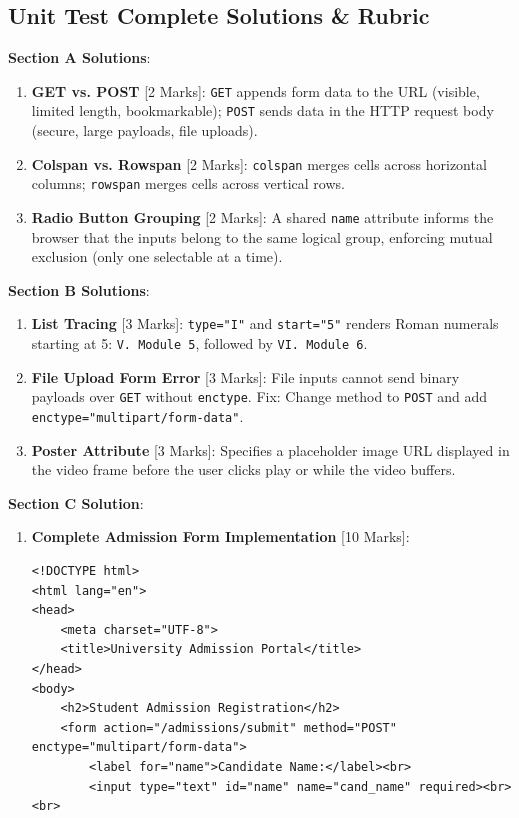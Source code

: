 \subsection{Unit Test Complete Solutions \& Rubric}

\begin{solutionbox}
\noindent\textbf{Section A Solutions}:
\begin{enumerate}
    \item \textbf{GET vs. POST} [2 Marks]: \texttt{GET} appends form data to the URL (visible, limited length, bookmarkable); \texttt{POST} sends data in the HTTP request body (secure, large payloads, file uploads).
    \item \textbf{Colspan vs. Rowspan} [2 Marks]: \texttt{colspan} merges cells across horizontal columns; \texttt{rowspan} merges cells across vertical rows.
    \item \textbf{Radio Button Grouping} [2 Marks]: A shared \texttt{name} attribute informs the browser that the inputs belong to the same logical group, enforcing mutual exclusion (only one selectable at a time).
\end{enumerate}

\noindent\textbf{Section B Solutions}:
\begin{enumerate}[start=4]
    \item \textbf{List Tracing} [3 Marks]: \texttt{type="I"} and \texttt{start="5"} renders Roman numerals starting at 5: \texttt{V. Module 5}, followed by \texttt{VI. Module 6}.
    \item \textbf{File Upload Form Error} [3 Marks]: File inputs cannot send binary payloads over \texttt{GET} without \texttt{enctype}. Fix: Change method to \texttt{POST} and add \texttt{enctype="multipart/form-data"}.
    \item \textbf{Poster Attribute} [3 Marks]: Specifies a placeholder image URL displayed in the video frame before the user clicks play or while the video buffers.
\end{enumerate}

\noindent\textbf{Section C Solution}:
\begin{enumerate}[start=7]
    \item \textbf{Complete Admission Form Implementation} [10 Marks]:
\begin{lstlisting}[language=HTML5]
<!DOCTYPE html>
<html lang="en">
<head>
    <meta charset="UTF-8">
    <title>University Admission Portal</title>
</head>
<body>
    <h2>Student Admission Registration</h2>
    <form action="/admissions/submit" method="POST" enctype="multipart/form-data">
        <label for="name">Candidate Name:</label><br>
        <input type="text" id="name" name="cand_name" required><br><br>


\end{lstlisting}
\end{enumerate}
\end{solutionbox}
